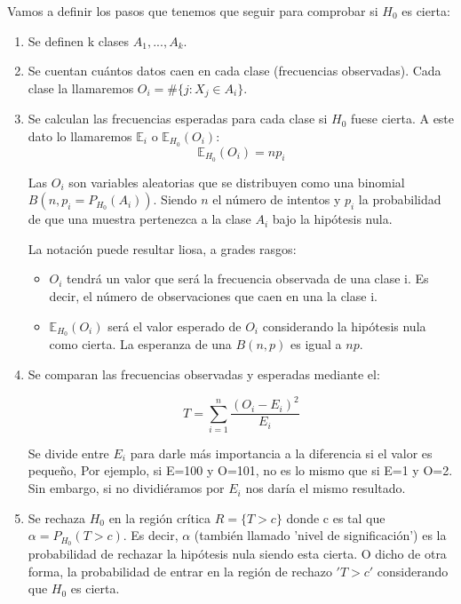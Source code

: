 \documentclass[palatino,nochap]{apuntes}
\begin{document}
Vamos a definir los pasos que tenemos que seguir para comprobar si $H_0$ es cierta:
\begin{enumerate}
\item Se definen k clases $A_1,...,A_k$. 

\item Se cuentan cuántos datos caen en cada clase (frecuencias observadas). Cada clase la llamaremos $O_i=\#\{j:X_j\in A_i\}$.

\item Se calculan las frecuencias esperadas para cada clase si $H_0$ fuese cierta. A este dato lo llamaremos $\mathbb{E}_i$ o $\mathbb{E}_{H_0}(O_i)$: 
\[
\mathbb{E}_{H_0}(O_i) = np_i
\]

\obs Las $O_i$ son variables aleatorias que se distribuyen como una binomial $B(n, p_i=P_{H_0}(A_i))$. Siendo $n$ el número de intentos y $p_i$ la probabilidad de que una muestra pertenezca a la clase $A_i$ bajo la hipótesis nula. 

La notación puede resultar liosa, a grades rasgos:
\begin{itemize}
\item $O_i$ tendrá un valor que será la frecuencia observada de una clase i. Es decir, el número de observaciones que caen en una la clase i.
\item $\mathbb{E}_{H_0}(O_i)$ será el valor esperado de $O_i$ considerando la hipótesis nula como cierta. La esperanza de una $B(n,p)$ es igual a $np$.
\end{itemize}

\item Se comparan las frecuencias observadas y esperadas mediante el:

\begin{defn}
\[T = \sum_{i=1}^n \frac{(O_i-E_i)^2}{E_i}\]
\end{defn}

Se divide entre $E_i$ para darle más importancia a la diferencia si el valor es pequeño, Por ejemplo, si E=100 y O=101, no es lo mismo que si E=1 y O=2. Sin embargo, si no dividiéramos por $E_i$ nos daría el mismo resultado.

\item Se rechaza $H_0$ en la región crítica $R=\{T > c\}$ donde c es tal que $\alpha=P_{H_0}(T>c)$. Es decir, $\alpha$ (también llamado 'nivel de significación') es la probabilidad de rechazar la hipótesis nula siendo esta cierta. O dicho de otra forma, la probabilidad de entrar en la región de rechazo $'T>c'$ considerando que $H_0$ es cierta.
\end{enumerate}
\end{document}
